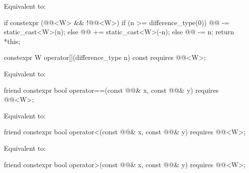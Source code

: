 \begin{itemdescr}
\pnum
\effects
Equivalent to:
\begin{codeblock}
if constexpr (@@<W> && !@@<W>) {
  if (n >= difference_type(0))
    @@ -= static_cast<W>(n);
  else
    @@ += static_cast<W>(-n);
} else {
  @@ -= n;
}
return *this;
\end{codeblock}
\end{itemdescr}

\begin{itemdecl}
constexpr W operator[](difference_type n) const
  requires @@<W>;
\end{itemdecl}

\begin{itemdescr}
\pnum
\effects
Equivalent to: 
\end{itemdescr}

\begin{itemdecl}
friend constexpr bool operator==(const @@& x, const @@& y)
  requires @@<W>;
\end{itemdecl}

\begin{itemdescr}
\pnum
\effects
Equivalent to: 
\end{itemdescr}

\begin{itemdecl}
friend constexpr bool operator<(const @@& x, const @@& y)
  requires @@<W>;
\end{itemdecl}

\begin{itemdescr}
\pnum
\effects
Equivalent to: 
\end{itemdescr}

\begin{itemdecl}
friend constexpr bool operator>(const @@& x, const @@& y)
  requires @@<W>;
\end{itemdecl}

